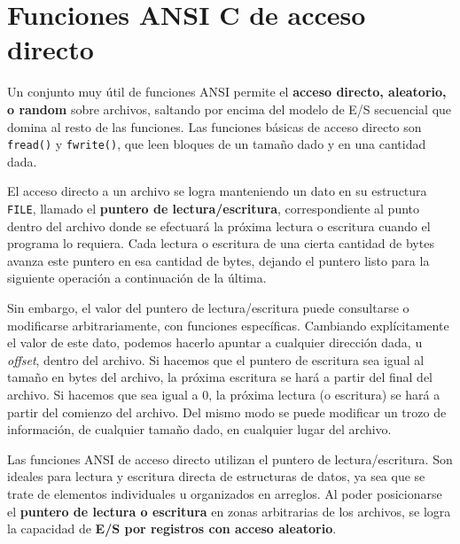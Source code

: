 \section{Funciones ANSI C de acceso directo}
\label{subsec:esarchivosansicdirect}

Un conjunto muy útil de funciones ANSI permite el \textbf{acceso directo, aleatorio, o
random} sobre archivos, saltando por encima del modelo de E/S secuencial que
domina al resto de las funciones. Las funciones básicas de acceso directo son
\lstinline{fread()} y \lstinline{fwrite()}, que leen bloques de un tamaño dado y en una cantidad dada.

El acceso directo a un archivo se logra manteniendo un dato en su estructura \lstinline{FILE}, 
llamado el \textbf{puntero de lectura/escritura},
correspondiente al punto dentro del archivo donde se efectuará la próxima lectura o escritura  
cuando el programa lo requiera. Cada lectura o escritura de una cierta cantidad de bytes
avanza este puntero en esa cantidad de bytes, dejando el puntero listo para la siguiente 
operación a continuación de la última.
 
Sin embargo, el valor del puntero de lectura/escritura puede consultarse o modificarse arbitrariamente, con funciones específicas. Cambiando explícitamente el valor de este dato, podemos hacerlo  
apuntar a cualquier dirección dada, u \textit{offset}, dentro del archivo. Si hacemos que el puntero de escritura sea 
igual al tamaño en bytes del archivo, la próxima escritura se hará a partir del final del
archivo. Si hacemos que sea igual a 0, la próxima lectura (o escritura) se hará a partir del comienzo del archivo. Del mismo modo se puede modificar un trozo de información, de cualquier tamaño dado, en cualquier lugar del archivo. 

Las funciones ANSI de acceso directo utilizan el puntero de lectura/escritura. Son ideales para lectura y escritura directa de estructuras de datos, ya sea que se trate de elementos individuales u organizados en arreglos. Al poder
posicionarse el \textbf{puntero de lectura o escritura} en zonas arbitrarias de los
archivos, se logra la capacidad de \textbf{E/S por registros con acceso aleatorio}.


